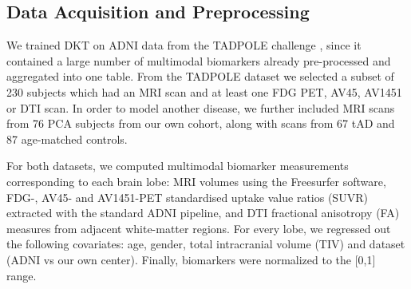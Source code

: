 \documentclass{llncs}
\begin{document}
%   



\subsection{Data Acquisition and Preprocessing}

We trained DKT on ADNI data from the TADPOLE challenge \cite{marinescu2018tadpole}, since it contained a large number of multimodal biomarkers already pre-processed and aggregated into one table. From the TADPOLE dataset we selected a subset of 230 subjects which had an MRI scan and at least one FDG PET, AV45, AV1451 or DTI scan. In order to model another disease, we further included MRI scans from 76 PCA subjects from our own cohort, along with scans from 67 tAD and 87 age-matched controls.
 
For both datasets, we computed multimodal biomarker measurements corresponding to each brain lobe: MRI volumes using the Freesurfer software, FDG-, AV45- and AV1451-PET standardised uptake value ratios (SUVR) extracted with the standard ADNI pipeline, and DTI fractional anisotropy (FA) measures from adjacent white-matter regions. For every lobe, we regressed out the following covariates: age, gender, total intracranial volume (TIV) and dataset (ADNI vs our own center). Finally, biomarkers were normalized to the [0,1] range. 
\end{document}
